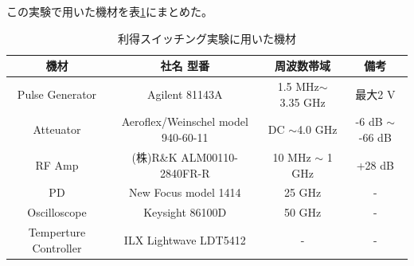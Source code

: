 この実験で用いた機材を表\ref{table:table_2_2_GS_setup}にまとめた。
\begin{table}[h]
  \caption{利得スイッチング実験に用いた機材}
  \label{table:table_2_2_GS_setup}
  \centering
  \begin{tabular}{cccc}
    \hline
    機材  & 社名 型番   & 周波数帯域 &備考 \\
    \hline \hline
    Pulse Generator  & Agilent 81143A & 1.5 MHz$\sim$ 3.35 GHz  &最大2 V \\
    Atteuator  &  Aeroflex/Weinschel model 940-60-11    & DC $\sim$4.0 GHz& -6 dB $\sim$ -66 dB\\
    RF Amp & (株)R\&K ALM00110-2840FR-R & 10 MHz $\sim$ 1 GHz & +28 dB\\
    PD & New Focus model 1414 & 25 GHz &-\\
    Oscilloscope  &  Keysight 86100D & 50 GHz  &-\\
     Temperture Controller & ILX Lightwave  LDT5412&-&-\\
       \hline
  \end{tabular}
\end{table}
